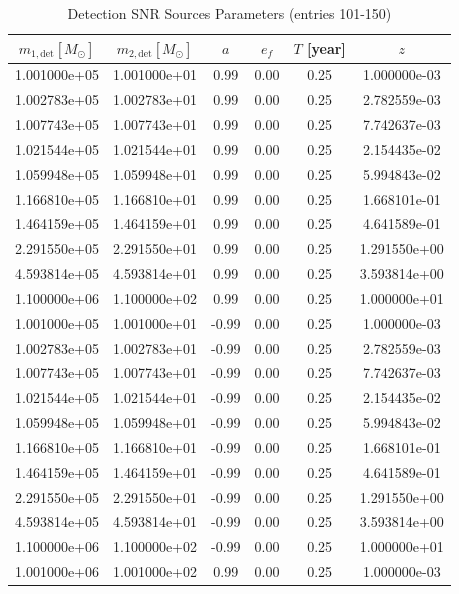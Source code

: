 \documentclass{article}
\begin{document}
\begin{table}[htbp]
\centering
\caption{Detection SNR Sources Parameters (entries 101-150)}
\label{tab:snr_sources_3}
\begin{tabular}{cccccc}
\hline
$m_{1,\mathrm{det}} [M_\odot]$ & $m_{2,\mathrm{det}} [M_\odot]$ & $a$ & $e_f$ & $T$ [year] & $z$ \\
\hline
1.001000e+05 & 1.001000e+01 & 0.99 & 0.00 & 0.25 & 1.000000e-03 \\
1.002783e+05 & 1.002783e+01 & 0.99 & 0.00 & 0.25 & 2.782559e-03 \\
1.007743e+05 & 1.007743e+01 & 0.99 & 0.00 & 0.25 & 7.742637e-03 \\
1.021544e+05 & 1.021544e+01 & 0.99 & 0.00 & 0.25 & 2.154435e-02 \\
1.059948e+05 & 1.059948e+01 & 0.99 & 0.00 & 0.25 & 5.994843e-02 \\
1.166810e+05 & 1.166810e+01 & 0.99 & 0.00 & 0.25 & 1.668101e-01 \\
1.464159e+05 & 1.464159e+01 & 0.99 & 0.00 & 0.25 & 4.641589e-01 \\
2.291550e+05 & 2.291550e+01 & 0.99 & 0.00 & 0.25 & 1.291550e+00 \\
4.593814e+05 & 4.593814e+01 & 0.99 & 0.00 & 0.25 & 3.593814e+00 \\
1.100000e+06 & 1.100000e+02 & 0.99 & 0.00 & 0.25 & 1.000000e+01 \\
1.001000e+05 & 1.001000e+01 & -0.99 & 0.00 & 0.25 & 1.000000e-03 \\
1.002783e+05 & 1.002783e+01 & -0.99 & 0.00 & 0.25 & 2.782559e-03 \\
1.007743e+05 & 1.007743e+01 & -0.99 & 0.00 & 0.25 & 7.742637e-03 \\
1.021544e+05 & 1.021544e+01 & -0.99 & 0.00 & 0.25 & 2.154435e-02 \\
1.059948e+05 & 1.059948e+01 & -0.99 & 0.00 & 0.25 & 5.994843e-02 \\
1.166810e+05 & 1.166810e+01 & -0.99 & 0.00 & 0.25 & 1.668101e-01 \\
1.464159e+05 & 1.464159e+01 & -0.99 & 0.00 & 0.25 & 4.641589e-01 \\
2.291550e+05 & 2.291550e+01 & -0.99 & 0.00 & 0.25 & 1.291550e+00 \\
4.593814e+05 & 4.593814e+01 & -0.99 & 0.00 & 0.25 & 3.593814e+00 \\
1.100000e+06 & 1.100000e+02 & -0.99 & 0.00 & 0.25 & 1.000000e+01 \\
1.001000e+06 & 1.001000e+02 & 0.99 & 0.00 & 0.25 & 1.000000e-03 \\

\end{tabular}
\end{table}
\end{document}
